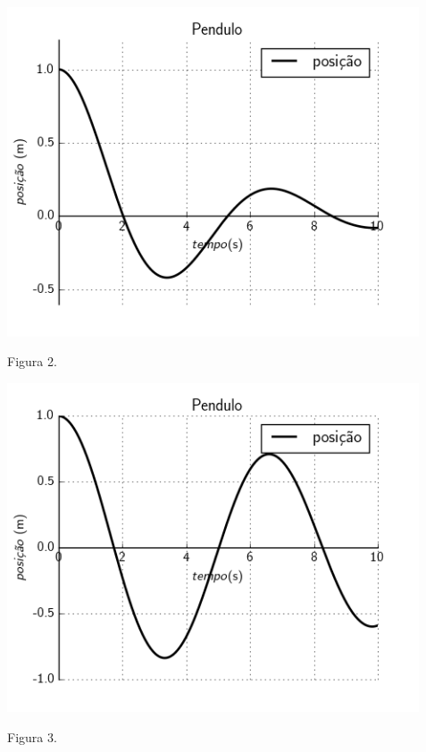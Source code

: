 \documentclass[a4paper]{article} %
\begin{document}
\begin{center}
	\includegraphics[width=4.80in,height=3.84in,keepaspectratio = false]{pendulo1_image1.png}
	
	\scriptsize Figura 2. 
\end{center}
\begin{center}	
	\includegraphics[width=4.80in,height=3.84in,keepaspectratio = false]{pendulo2_image1.png}
	
	\scriptsize Figura 3. 
\end{center}
\end{document}
